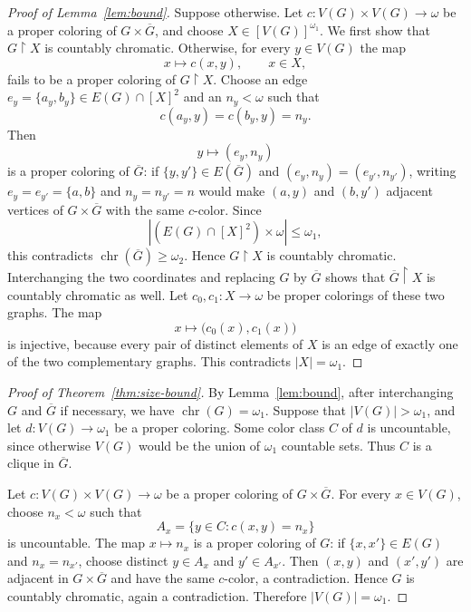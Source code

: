 \documentclass{amsart}
\numberwithin{equation}{section}
\theoremstyle{definition}
\theoremstyle{remark}
\newcommand{\chr}{\operatorname{chr}}
\newcommand{\restr}{\mathbin{\upharpoonright}}
\begin{document}
\begin{proof}[Proof of Lemma~\ref{lem:bound}]
Suppose otherwise.  Let
$c:V(G)\times V(G)\to\omega$ be a proper coloring of
$G\times\overline G$, and choose $X\in[V(G)]^{\omega_1}$.  We first
show that $G\restr X$ is countably chromatic.  Otherwise, for every
$y\in V(G)$ the map
\begin{displaymath}
 x\longmapsto c(x,y),\qquad x\in X,
\end{displaymath}
fails to be a proper coloring of $G\restr X$.  Choose an edge
$e_y=\{a_y,b_y\}\in E(G)\cap[X]^2$ and an $n_y<\omega$ such that
\begin{displaymath}
 c(a_y,y)=c(b_y,y)=n_y.
\end{displaymath}
Then
\begin{displaymath}
 y\longmapsto(e_y,n_y)
\end{displaymath}
is a proper coloring of $\overline G$: if $\{y,y'\}\in E(\overline G)$
and $(e_y,n_y)=(e_{y'},n_{y'})$, writing
$e_y=e_{y'}=\{a,b\}$ and $n_y=n_{y'}=n$ would make $(a,y)$ and
$(b,y')$ adjacent vertices of $G\times\overline G$ with the same
$c$-color.  Since
\begin{displaymath}
 |(E(G)\cap[X]^2)\times\omega|\leq\omega_1,
\end{displaymath}
this contradicts $\chr(\overline G)\geq\omega_2$.  Hence
$G\restr X$ is countably chromatic.  Interchanging the two coordinates
and replacing $G$ by $\overline G$ shows that
$\overline G\restr X$ is countably chromatic as well.  Let
$c_0,c_1:X\to\omega$ be proper colorings of these two graphs.  The map
\begin{displaymath}
 x\longmapsto\bigl(c_0(x),c_1(x)\bigr)
\end{displaymath}
is injective, because every pair of distinct elements of $X$ is an
edge of exactly one of the two complementary graphs.  This contradicts
$|X|=\omega_1$.
\end{proof}

\begin{proof}[Proof of Theorem~\ref{thm:size-bound}]
By Lemma~\ref{lem:bound}, after interchanging $G$ and $\overline G$
if necessary, we have $\chr(G)=\omega_1$.  Suppose that
$|V(G)|>\omega_1$, and let $d:V(G)\to\omega_1$ be a proper coloring.
Some color class $C$ of $d$ is uncountable, since otherwise $V(G)$
would be the union of $\omega_1$ countable sets.  Thus $C$ is a clique
in $\overline G$.

Let $c:V(G)\times V(G)\to\omega$ be a proper coloring of
$G\times\overline G$.  For every $x\in V(G)$, choose $n_x<\omega$ such
that
\begin{displaymath}
 A_x=\{y\in C:c(x,y)=n_x\}
\end{displaymath}
is uncountable.  The map $x\mapsto n_x$ is a proper coloring of
$G$: if $\{x,x'\}\in E(G)$ and $n_x=n_{x'}$, choose distinct
$y\in A_x$ and $y'\in A_{x'}$.  Then $(x,y)$ and $(x',y')$ are
adjacent in $G\times\overline G$ and have the same $c$-color, a
contradiction.  Hence $G$ is countably chromatic, again a
contradiction.  Therefore $|V(G)|=\omega_1$.
\end{proof}
\end{document}

